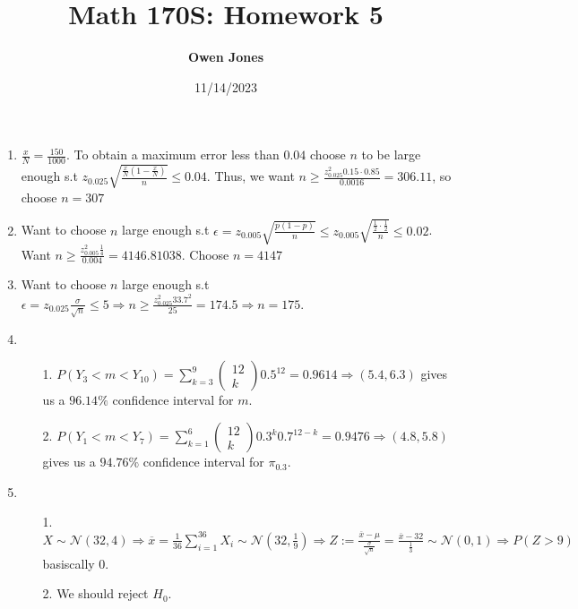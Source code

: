 \documentclass[10pt]{article}
\title{\bf Math 170S\@: Homework 5}
\date{11/14/2023}
\author{\bf Owen Jones}
\begin{document}
\maketitle
\begin{enumerate}[label=\textbf{Problem \arabic*.}]
    \item $\frac{x}{N}=\frac{150}{1000}$. To obtain a maximum error less than $0.04$ choose $n$ to be large enough s.t $z_{{0.025}}\sqrt{\frac{\frac{x}{N}(1-\frac{x}{N})}{n}}\le0.04$.
    Thus, we want $n\ge\frac{z_{0.025}^2 0.15\cdot0.85}{0.0016}=306.11$, so choose $n=307$
    \item Want to choose $n$ large enough s.t $\epsilon= z_{0.005}\sqrt{\frac{p(1-p)}{n}}\le z_{0.005}\sqrt{\frac{\frac{1}{2}\cdot \frac{1}{2}}{n}}\le0.02$. Want $n\ge\frac{z_{0.005}^2\frac{1}{4}}{0.004}=4146.81038$. Choose $n=4147$
    \item Want to choose $n$ large enough s.t $\epsilon=z_{0.025}\frac{\sigma}{\sqrt{n}}\le5\Rightarrow n\ge\frac{z_{0.025}^2 33.7^2}{25}=174.5\Rightarrow n=175$.
    \item \begin{itemize}
        \item [1.]$\displaystyle P(Y_3<m<Y_{10})=\sum_{k=3}^{9}\begin{pmatrix}
            12\\
            k
        \end{pmatrix} {0.5}^{12}=0.9614\Rightarrow (5.4,6.3)$ gives us a $96.14\%$ confidence interval for $m$.
        \item [2.] $\displaystyle P(Y_1<m<Y_7)=\sum_{k=1}^{6}\begin{pmatrix}
            12\\
            k
        \end{pmatrix} {0.3}^k{0.7}^{12-k}=0.9476\Rightarrow(4.8,5.8)$ gives us a $94.76\%$ confidence interval for $\pi_{0.3}$. 
    \end{itemize}
    \item \begin{itemize}
        \item [1.] $X\sim\mathcal{N}(32,4)\Rightarrow\overline{x}=\displaystyle\frac{1}{36}\sum_{i=1}^{36}X_i\sim\mathcal{N}(32,\frac{1}{9})\Rightarrow Z:=\frac{\overline{x}-\mu}{\frac{\sigma}{\sqrt{n}}}=\frac{\overline{x}-32}{\frac{1}{3}}\sim \mathcal{N}(0,1)\Rightarrow P(Z>9)$ basiscally $0$.
        \item [2.] We should reject $H_0$.
    \end{itemize}
\end{enumerate}
\end{document}
